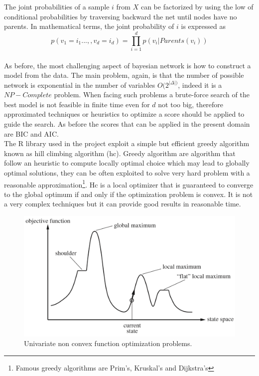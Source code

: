\documentclass{article}
\begin{document}
The joint probabilities of a sample $i$ from $X$ can be factorized by using the low of conditional probabilities by traversing backward the net until nodes have no parents. In mathematical terms, the joint probability of $i$ is expressed as
\begin{equation}
    p(v_1 = i_1...,,v_d=i_d) = \prod\limits_{i=1}^{d}p(v_i|Parents(v_i))
\end{equation} \\
As before, the most challenging aspect of bayesian network is how to construct a model from the data. The main problem, again, is that the number of possible network is exponential in the number of variables $O(2^{|\Delta|)}$, indeed it is a $NP-Complete$ problem. When facing such problems a brute-force search of the best model is not feasible in finite time even for $d$ not too big, therefore approximated techniques or heuristics to optimize a score should be applied to guide the search. As before the scores that can be applied in the present domain are BIC and AIC.\\
The R library used in the project exploit a simple but efficient greedy algorithm known as hill climbing algorithm (hc). Greedy algorithm are algorithm that follow an heuristic to compute locally optimal choice which may lead to globally optimal solutions, they can be often exploited to solve very hard problem with a reasonable approximation\footnote{Famous greedy algorithms are Prim's, Kruskal's and Dijkstra's}. Hc is a local optimizer that is guaranteed to converge to the global optimum if and only if the optimization problem is convex. It is not a very complex techniques but it can provide good results in reasonable time.
\begin{figure}[H]
       \centering
       \includegraphics[width=1\textwidth]{hc.PNG}
       \caption{Univariate non convex function optimization problems. \cite{ArtInt}}
\end{figure}
\end{document}
